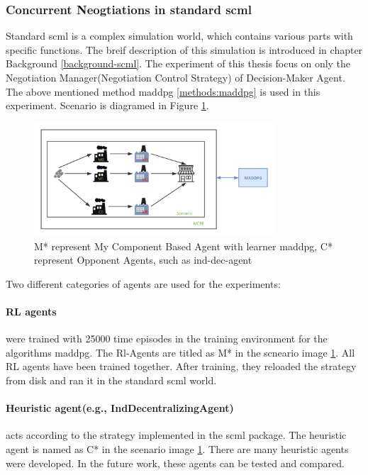 \subsubsection{Concurrent Neogtiations in standard \gls{scml}}
Standard \gls{scml} is a complex simulation world, which contains various parts with specific functions. The breif description of this simulation is introduced in chapter Background \ref{background-scml}. The experiment of this thesis focus on only the Negotiation Manager(Negotiation Control Strategy) of Decision-Maker Agent. The above mentioned method maddpg \ref{methods:maddpg} is used in this experiment. 
Scenario is diagramed in Figure \ref{fig:scenario-standard-scml}.

\begin{figure}[htbp]
\centering
\includegraphics[width=0.80\textwidth]{./images/scenario-standard-scml.png}
\caption{M* represent My Component Based Agent with learner \gls{maddpg}, C* represent Opponent Agents, such as \gls{ind-dec-agent}}
\label{fig:scenario-standard-scml}
\end{figure}

Two different categories of agents are used for the experiments:
\paragraph{RL agents} were trained with 25000 time episodes in the training environment for the algorithms maddpg. The Rl-Agents are titled as M* in the scneario image \ref{fig:scenario-standard-scml}. All RL agents have been trained together. After training, they reloaded the strategy from disk and ran it in the standard scml world.

\paragraph{Heuristic agent(e.g., IndDecentralizingAgent)} acts according to the strategy implemented in the scml package. The heuristic agent is named as C* in the scenario image \ref{fig:scenario-standard-scml}. There are many heuristic agents were developed. In the future work, these agents can be tested and compared.



